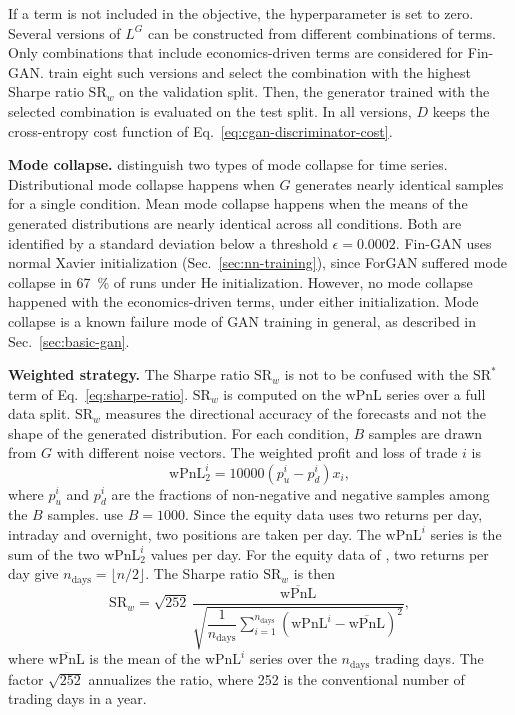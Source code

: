 If a term is not included in the objective, the hyperparameter is set to zero. Several versions of $L^{G}$ can be constructed from different combinations of terms. Only combinations that include economics-driven terms are considered for Fin-GAN. \textcite{vuleticFinGANForecastingClassifying2024} train eight such versions and select the combination with the highest Sharpe ratio $\mathrm{SR}_{w}$ on the validation split. Then, the generator trained with the selected combination is evaluated on the test split. In all versions, $D$ keeps the cross-entropy cost function of Eq.~\eqref{eq:cgan-discriminator-cost}.

\textbf{Mode collapse.} \textcite{vuleticFinGANForecastingClassifying2024} distinguish two types of mode collapse for time series. Distributional mode collapse happens 
when $G$ generates nearly identical samples for a single condition. 
Mean mode collapse happens when the means of the generated
distributions are nearly identical across all conditions.
Both are identified by a standard deviation below a threshold $\epsilon=0.0002$. Fin-GAN uses normal Xavier initialization (Sec.~\ref{sec:nn-training}), since ForGAN suffered mode collapse in \SI{67}{\percent} of runs under He initialization. However, no mode collapse happened with the economics-driven terms, under either initialization. Mode collapse is a known failure mode of GAN training in general, as described in Sec.~\ref{sec:basic-gan}. 

\textbf{Weighted strategy.} The Sharpe ratio $\mathrm{SR}_{w}$ is not to be confused with the $\mathrm{SR}^{*}$ term of Eq.~\eqref{eq:sharpe-ratio}. $\mathrm{SR}_{w}$ is computed on the $\mathrm{wPnL}$ series over a full data split. $\mathrm{SR}_{w}$ measures the directional accuracy of the forecasts and not the shape of the generated distribution. For each condition, $B$ samples are drawn from $G$ with different noise vectors. The weighted profit and loss of trade $i$ is
\begin{equation}
    \label{eq:wpnl-trade}
    \mathrm{wPnL}^{i}_{2} = 10000 \left( p^{i}_{u} - p^{i}_{d} \right) x_i ,
\end{equation}
where $p^{i}_{u}$ and $p^{i}_{d}$ are the fractions of non-negative and negative samples among the $B$ samples. \textcite{vuleticFinGANForecastingClassifying2024} use $B = \num{1000}$. Since the equity data uses two returns per day, intraday and overnight, two positions are taken per day. The $\mathrm{wPnL}^{i}$ series is 
the sum of the two $\mathrm{wPnL}^{i}_{2}$ values per day. 
For the equity data of \textcite{vuleticFinGANForecastingClassifying2024}, two returns per day give $n_{\text{days}} = \lfloor n/2 \rfloor$. The Sharpe ratio $\mathrm{SR}_{w}$ is then
\begin{equation}
    \label{eq:sharpe-weighted}
    \mathrm{SR}_{w} = \sqrt{252} \,
    \frac{\overline{\mathrm{wPnL}}}
         {\sqrt{\dfrac{1}{n_{\text{days}}}
          \sum_{i=1}^{n_{\text{days}}}
          \left( \mathrm{wPnL}^{i} - \overline{\mathrm{wPnL}} \right)^{2}}},
\end{equation}
where $\overline{\mathrm{wPnL}}$ is the mean of the $\mathrm{wPnL}^{i}$ series over the $n_{\text{days}}$ trading days. The factor $\sqrt{252}$ annualizes the ratio, where 252 is the conventional number of trading days in a year.